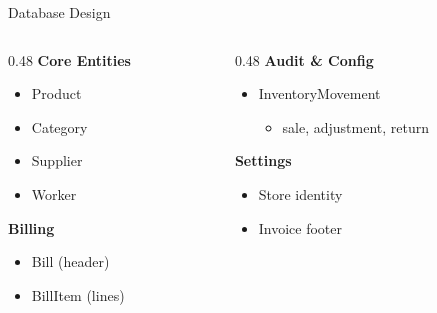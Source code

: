 \documentclass[aspectratio=169,11pt]{beamer}
\begin{document}
\begin{frame}{Database Design}

\begin{columns}[T]
  \begin{column}{0.48\textwidth}
    \textbf{\textcolor{accent1}{Core Entities}}
    \begin{itemize}
      \item Product
      \item Category
      \item Supplier
      \item Worker
    \end{itemize}
    
    \vspace{0.4cm}
    
    \textbf{\textcolor{accent1}{Billing}}
    \begin{itemize}
      \item Bill (header)
      \item BillItem (lines)
    \end{itemize}
  \end{column}
  
  \begin{column}{0.48\textwidth}
    \textbf{\textcolor{accent1}{Audit \& Config}}
    \begin{itemize}
      \item InventoryMovement
      \begin{itemize}
        \item sale, adjustment, return
      \end{itemize}
    \end{itemize}
    
    \vspace{0.4cm}
    
    \textbf{\textcolor{accent1}{Settings}}
    \begin{itemize}
      \item Store identity
      \item Invoice footer
    \end{itemize}
  \end{column}
\end{columns}

\end{frame}
\end{document}
